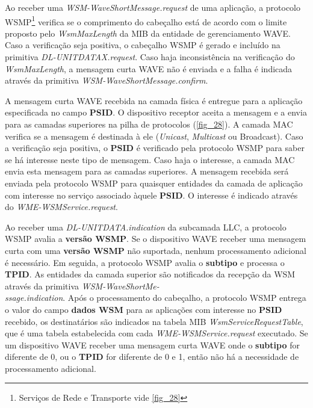 \documentclass[
12pt,				%
openright,			%
oneside,			%
a4paper,			%
brazil,				%
]{abntex2}
\begin{document}
	\par Ao receber uma \textit{WSM-WaveShortMessage.request} de uma aplicação, a protocolo WSMP{\footnote{Serviços de Rede e Transporte vide \autoref{fig_28}}} verifica se o comprimento do cabeçalho está de acordo com o limite proposto pelo \textit{WsmMaxLength} da MIB da entidade de gerenciamento WAVE. Caso a verificação seja positiva, o cabeçalho WSMP é gerado e incluído na primitiva \textit{DL-UNITDATAX.request}. Caso haja inconsistência na verificação do \textit{WsmMaxLength}, a mensagem curta WAVE não é enviada e a falha é indicada através da primitiva \textit{WSM-WaveShortMessage.confirm}.

	\par A mensagem curta WAVE recebida na camada física é entregue para a aplicação especificada no campo \textbf{PSID}. O dispositivo receptor aceita a mensagem e a envia para as camadas superiores na pilha de protocolos (\autoref{fig_28}). A camada MAC verifica se a mensagem é destinada à ele (\textit{Unicast}, \textit{Multicast} ou Broadcast). Caso a verificação seja positiva, o \textbf{PSID} é verificado pela protocolo WSMP para saber se há interesse neste tipo de mensagem. Caso haja o interesse, a camada MAC envia esta mensagem para as camadas superiores. A mensagem recebida será enviada pela protocolo WSMP para quaisquer entidades da camada de aplicação com interesse no serviço associado àquele \textbf{PSID}. O interesse é indicado através do \textit{WME-WSMService.request}.

	\par Ao receber uma \textit{DL-UNITDATA.indication} da subcamada LLC, a protocolo WSMP avalia a \textbf{versão WSMP}. Se o dispositivo WAVE receber uma mensagem curta com uma \textbf{versão WSMP} não suportada, nenhum processamento adicional é necessário. Em seguida, a protocolo WSMP avalia o \textbf{subtipo} e processa o \textbf{TPID}. As entidades da camada superior são notificados da recepção da WSM através da primitiva \textit{WSM-WaveShortMe-\\ssage.indication}. Após o processamento do cabeçalho, a protocolo WSMP entrega o valor do campo \textbf{dados WSM} para as aplicações com interesse no \textbf{PSID} recebido, os destinatários são indicados na tabela MIB \textit{WsmServiceRequestTable}, que é uma tabela estabelecida com cada \textit{WME-WSMService.request} executado. Se um dispositivo WAVE receber uma mensagem curta WAVE onde o \textbf{subtipo} for diferente de 0, ou o \textbf{TPID} for diferente de 0 e 1, então não há a necessidade de processamento adicional. 
\end{document}
